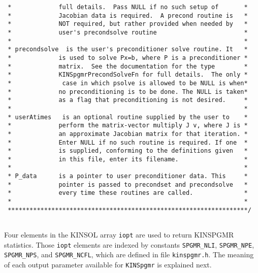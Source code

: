 \begin{verbatim}
 *             full details.  Pass NULL if no such setup of       *
 *             Jacobian data is required.  A precond routine is   *
 *             NOT required, but rather provided when needed by   *
 *             user's precondsolve routine                        *
 *                                                                *
 * precondsolve  is the user's preconditioner solve routine. It   *
 *             is used to solve Px=b, where P is a preconditioner *
 *             matrix.  See the documentation for the type        *
 *             KINSpgmrPrecondSolveFn for full details.  The only *
 *              case in which psolve is allowed to be NULL is when*
 *             no preconditioning is to be done. The NULL is taken*
 *             as a flag that preconditioning is not desired.     *
 *                                                                *
 * userAtimes   is an optional routine supplied by the user to    *
 *             perform the matrix-vector multiply J v, where J is *
 *             an approximate Jacobian matrix for that iteration. *
 *             Enter NULL if no such routine is required. If one  *
 *             is supplied, conforming to the definitions given   *
 *             in this file, enter its filename.                  *
 *                                                                *
 * P_data      is a pointer to user preconditioner data. This     *
 *             pointer is passed to precondset and precondsolve   *
 *             every time these routines are called.              *
 *                                                                *
 ******************************************************************/
  
\end{verbatim}
Four elements in the KINSOL array {\tt iopt} are used to return KINSPGMR
statistics. Those {\tt iopt} elements are indexed by constants
{\tt SPGMR\_NLI}, {\tt SPGMR\_NPE}, {\tt SPGMR\_NPS}, and {\tt SPGMR\_NCFL}, 
which are defined in file {\tt kinspgmr.h}. The meaning of each output 
parameter available for {\tt KINSpgmr} is explained next.

